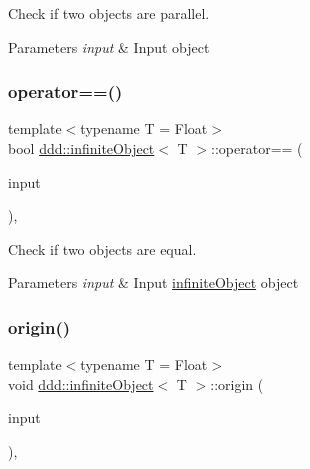 Check if two objects are parallel. 


\begin{DoxyParams}{Parameters}
{\em input} & Input object \\
\hline
\end{DoxyParams}
\mbox{\label{classddd_1_1infinite_object_a7cd3342d60d4de4e4fc91d90fa9cc065}} 
\subsubsection{\texorpdfstring{operator==()}{operator==()}}
{\footnotesize\ttfamily template$<$typename T = Float$>$ \\
bool \hyperlink{classddd_1_1infinite_object}{ddd\+::infinite\+Object}$<$ T $>$\+::operator== (\begin{DoxyParamCaption}\item[{const \hyperlink{classddd_1_1infinite_object}{infinite\+Object}$<$ T $>$ \&}]{input }\end{DoxyParamCaption})\hspace{0.3cm}{\ttfamily [inline]}, {\ttfamily [inherited]}}



Check if two objects are equal. 


\begin{DoxyParams}{Parameters}
{\em input} & Input \hyperlink{classddd_1_1infinite_object}{infinite\+Object} object \\
\hline
\end{DoxyParams}
\mbox{\label{classddd_1_1infinite_object_a82ecd5fc09ecfe5b1fe9a2609dd1465e}} 
\subsubsection{\texorpdfstring{origin()}{origin()}}
{\footnotesize\ttfamily template$<$typename T = Float$>$ \\
void \hyperlink{classddd_1_1infinite_object}{ddd\+::infinite\+Object}$<$ T $>$\+::origin (\begin{DoxyParamCaption}\item[{const \hyperlink{classddd_1_1point}{point}$<$ T $>$ \&}]{input }\end{DoxyParamCaption})\hspace{0.3cm}{\ttfamily [inline]}, {\ttfamily [inherited]}}



